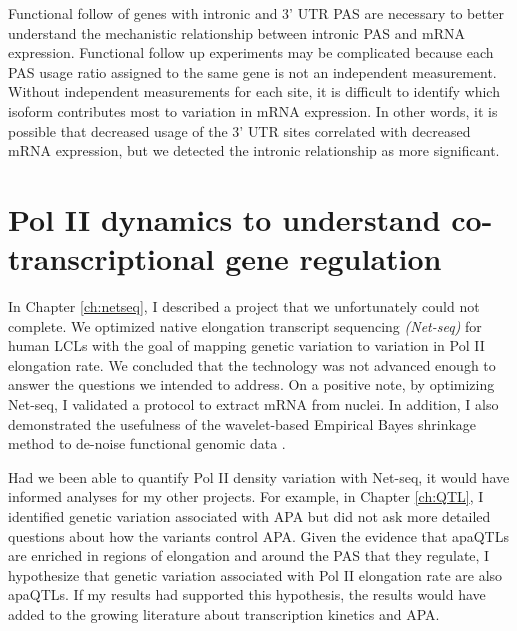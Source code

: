 Functional follow of genes with intronic and 3' UTR PAS are necessary to better understand the mechanistic relationship between intronic PAS and mRNA expression. Functional follow up experiments may be complicated because each PAS usage ratio assigned to the same gene is not an independent measurement. Without independent measurements for each site, it is difficult to identify which isoform contributes most to variation in mRNA expression. In other words, it is possible that decreased usage of the 3' UTR sites correlated with decreased mRNA expression, but we detected the intronic relationship as more significant. 


\section{Pol II dynamics to understand co-transcriptional gene regulation}

In Chapter \ref{ch:netseq}, I described a project that we unfortunately could not complete. We optimized native elongation transcript sequencing \emph{(Net-seq)} for human LCLs with the goal of mapping genetic variation to variation in Pol II elongation rate. We concluded that the technology was not advanced enough to answer the questions we intended to address. On a positive note, by optimizing Net-seq, I validated a protocol to extract mRNA from nuclei. In addition, I also demonstrated the usefulness of the wavelet-based Empirical Bayes shrinkage method to de-noise functional genomic data \citep{xing_flexible_2016}. 

Had we been able to quantify Pol II density variation with Net-seq, it would have informed analyses for my other projects. For example, in Chapter \ref{ch:QTL}, I identified genetic variation associated with APA but did not ask more detailed questions about how the variants control APA. Given the evidence that apaQTLs are enriched in regions of elongation and around the PAS that they regulate, I hypothesize that genetic variation associated with Pol II elongation rate are also apaQTLs. If my results had supported this hypothesis, the results would have added to the growing literature about transcription kinetics and APA.


